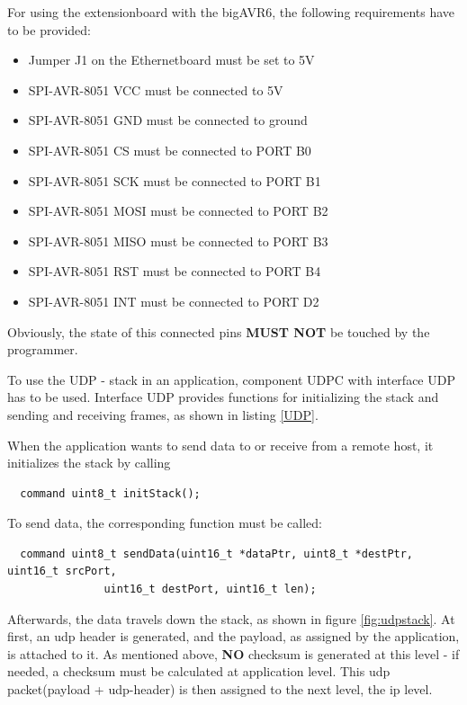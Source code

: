 For using the extensionboard with the bigAVR6, the following requirements have to be provided:

\begin{itemize}
 \item Jumper J1 on the Ethernetboard must be set to 5V
 \item SPI-AVR-8051 VCC  must be connected to 5V
 \item SPI-AVR-8051 GND  must be connected to ground
 \item SPI-AVR-8051 CS   must be connected to PORT B0
 \item SPI-AVR-8051 SCK  must be connected to PORT B1
 \item SPI-AVR-8051 MOSI must be connected to PORT B2
 \item SPI-AVR-8051 MISO must be connected to PORT B3
 \item SPI-AVR-8051 RST  must be connected to PORT B4
 \item SPI-AVR-8051 INT  must be connected to PORT D2  
\end{itemize}

Obviously, the state of this connected pins \textbf{MUST NOT} be touched by the programmer.

To use the UDP - stack in an application, component UDPC with interface UDP has to be used. Interface UDP provides functions for initializing the stack and sending and receiving frames, as shown in listing \ref{UDP}.




When the application wants to send data to or receive from a remote host, it initializes the stack by calling

\begin{lstlisting}
  command uint8_t initStack();
\end{lstlisting}

To send data, the corresponding function must be called:

\begin{lstlisting}
  command uint8_t sendData(uint16_t *dataPtr, uint8_t *destPtr, uint16_t srcPort,
			   uint16_t destPort, uint16_t len);
\end{lstlisting}

Afterwards, the data travels down the stack, as shown in figure \ref{fig:udpstack}. At first, an udp header is generated, and the payload, as assigned by the application, is attached to it. As mentioned above, \textbf{NO} checksum is generated at this level - if needed, a checksum must be calculated at application level. This udp packet(payload + udp-header) is then assigned to the next level, the ip level.

